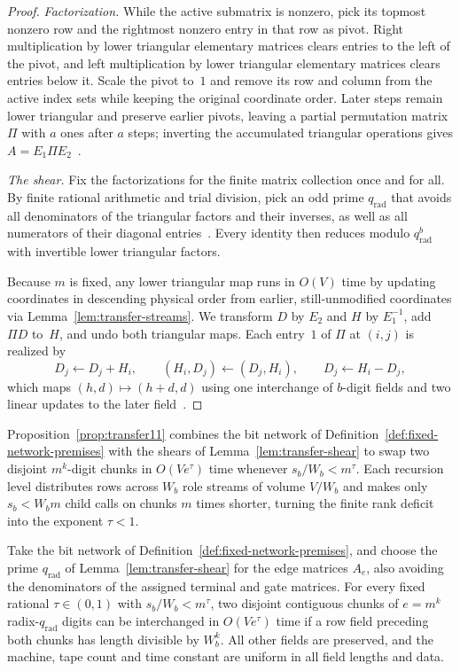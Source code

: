 \begin{proof}
\emph{Factorization.}
While the active submatrix is nonzero, pick its topmost nonzero row and the rightmost nonzero entry in that row as pivot. Right multiplication by lower triangular elementary matrices clears entries to the left of the pivot, and left multiplication by lower triangular elementary matrices clears entries below it. Scale the pivot to~$1$ and remove its row and column from the active index sets while keeping the original coordinate order. Later steps remain lower triangular and preserve earlier pivots, leaving a partial permutation matrix $\Pi$ with $a$ ones after $a$ steps; inverting the accumulated triangular operations gives $A=E_1\Pi E_2$~\cite[Lemma~9, \S4.1]{OAI26}.

\emph{The shear.}
Fix the factorizations for the finite matrix collection once and for all. By finite rational arithmetic and trial division, pick an odd prime $q_{\mathrm{rad}}$ that avoids all denominators of the triangular factors and their inverses, as well as all numerators of their diagonal entries~\cite[proof of Lemma~10, \S4.1]{OAI26}. Every identity then reduces modulo $q_{\mathrm{rad}}^b$ with invertible lower triangular factors.

Because $m$ is fixed, any lower triangular map runs in $O(V)$ time by updating coordinates in descending physical order from earlier, still-unmodified coordinates via Lemma~\ref{lem:transfer-streams}. We transform $D$ by $E_2$ and $H$ by $E_1^{-1}$, add $\Pi D$ to~$H$, and undo both triangular maps. Each entry~$1$ of $\Pi$ at $(i,j)$ is realized by
\[
  D_j\leftarrow D_j+H_i,\qquad(H_i,D_j)\leftarrow(D_j,H_i),\qquad D_j\leftarrow H_i-D_j ,
\]
which maps $(h,d)\mapsto(h+d,d)$ using one interchange of $b$-digit fields and two linear updates to the later field~\cite[proof of Lemma~10, \S4.1]{OAI26}.
\end{proof}

Proposition~\ref{prop:transfer11} combines the bit network of Definition~\ref{def:fixed-network-premises} with the shears of Lemma~\ref{lem:transfer-shear} to swap two disjoint $m^k$-digit chunks in $O(V e^\tau)$ time whenever $s_b/W_b<m^\tau$. Each recursion level distributes rows across $W_b$ role streams of volume $V/W_b$ and makes only $s_b<W_b m$ child calls on chunks $m$ times shorter, turning the finite rank deficit into the exponent $\tau<1$.

\begin{proposition}\label{prop:transfer11}
Take the bit network of Definition~\ref{def:fixed-network-premises}, and choose the prime $q_{\mathrm{rad}}$ of
Lemma~\ref{lem:transfer-shear} for the edge matrices $A_e$, also avoiding the denominators of the assigned terminal and
gate matrices. For every fixed rational $\tau\in(0,1)$ with $s_b/W_b<m^\tau$, two disjoint contiguous chunks of $e=m^k$
radix-$q_{\mathrm{rad}}$ digits can be interchanged in $O(Ve^\tau)$ time if a row field preceding both chunks has
length divisible by $W_b^k$. All other fields are preserved, and the machine, tape count and time constant are uniform
in all field lengths and data.
\end{proposition}


